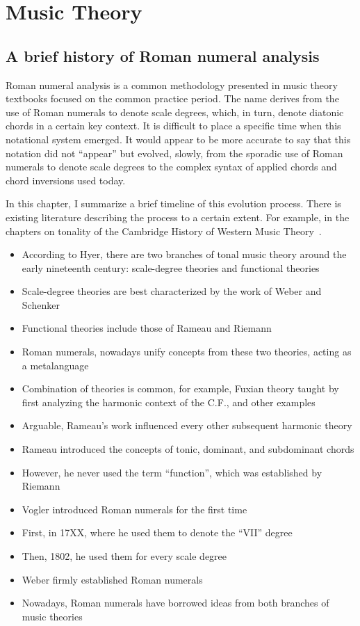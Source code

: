 \section{Music Theory}
\subsection{A brief history of Roman numeral analysis}


Roman numeral analysis is a common methodology presented in music theory textbooks focused on the common practice period.
The name derives from the use of Roman numerals to denote scale degrees, which, in turn, denote diatonic chords in a certain key context.
It is difficult to place a specific time when this notational system emerged.
It would appear to be more accurate to say that this notation did not ``appear'' but evolved, slowly, from the sporadic use of Roman numerals to denote scale degrees to the complex syntax of applied chords and chord inversions used today.

In this chapter, I summarize a brief timeline of this evolution process.
There is existing literature describing the process to a certain extent.
For example, in the chapters on tonality of the Cambridge History of Western Music Theory~\parencite{christensen_2002}.

\begin{itemize}
    \item According to Hyer, there are two branches of tonal music theory around the early nineteenth century: scale-degree theories and functional theories
    \item Scale-degree theories are best characterized by the work of Weber and Schenker
    \item Functional theories include those of Rameau and Riemann
    \item Roman numerals, nowadays unify concepts from these two theories, acting as a metalanguage
    \item Combination of theories is common, for example, Fuxian theory taught by first analyzing the harmonic context of the C.F., and other examples
    \item Arguable, Rameau's work influenced every other subsequent harmonic theory
    \item Rameau introduced the concepts of tonic, dominant, and subdominant chords
    \item However, he never used the term ``function'', which was established by Riemann
    \item Vogler introduced Roman numerals for the first time
    \item First, in 17XX, where he used them to denote the ``VII'' degree
    \item Then, 1802, he used them for every scale degree
    \item Weber firmly established Roman numerals
    \item Nowadays, Roman numerals have borrowed ideas from both branches of music theories
\end{itemize}



